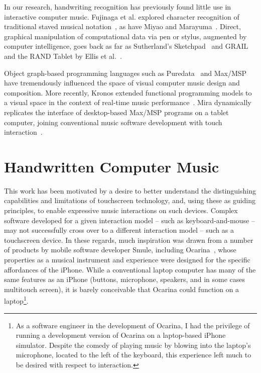 \documentclass{nime-alternate}
\begin{document}
In our research, handwriting recognition has previously found little use in interactive computer music. 
Fujinaga et al. explored character recognition of traditional staved musical notation~\cite{fujinaga1989computer, fujinaga1996exemplar}, as have Miyao and Marayuma~\cite{miyao2007online}. 
Direct, graphical manipulation of computational data via pen or stylus, augmented by computer intelligence, goes back as far as Sutherland's Sketchpad~\cite{sutherland1964sketch} and GRAIL and the RAND Tablet by Ellis et al.~\cite{davis1964rand}. 

Object graph-based programming languages such as Puredata~\cite{puckette1996pure} and Max/MSP~\cite{zicarelli1998extensible} have tremendously influenced the space of visual computer music design and composition. 
More recently, Kronos extended functional programming models to a visual space in the context of real-time music performance~\cite{norilo2012visualization}. 
Mira dynamically replicates the interface of desktop-based Max/MSP programs on a tablet computer, joining conventional music software development with touch interaction~\cite{tarakajian2013anmira}. 


%
%

\section{Handwritten Computer Music}
\label{sec:HandwrittenComputerMusic}

This work has been motivated by a desire to better understand the distinguishing capabilities and limitations of touchscreen technology, and, using these as guiding principles, to enable expressive music interactions on such devices. 
Complex software developed for a given interaction model -- such as keyboard-and-mouse -- may not successfully cross over to a different interaction model -- such as a touchscreen device. 
In these regards, much inspiration was drawn from a number of products by mobile software developer Smule, including Ocarina~\cite{wang2014ocarina}, whose properties as a musical instrument and experience were designed for the specific affordances of the iPhone. 
While a conventional laptop computer has many of the same features as an iPhone (buttons, microphone, speakers, and in some cases multitouch screen), it is barely conceivable that Ocarina could function on a laptop\footnote{As a software engineer in the development of Ocarina, I had the privilege of running a development version of Ocarina on a laptop-based iPhone simulator. Despite the comedy of playing music by blowing into the laptop's microphone, located to the left of the keyboard, this experience left much to be desired with respect to interaction.}.
\end{document}
